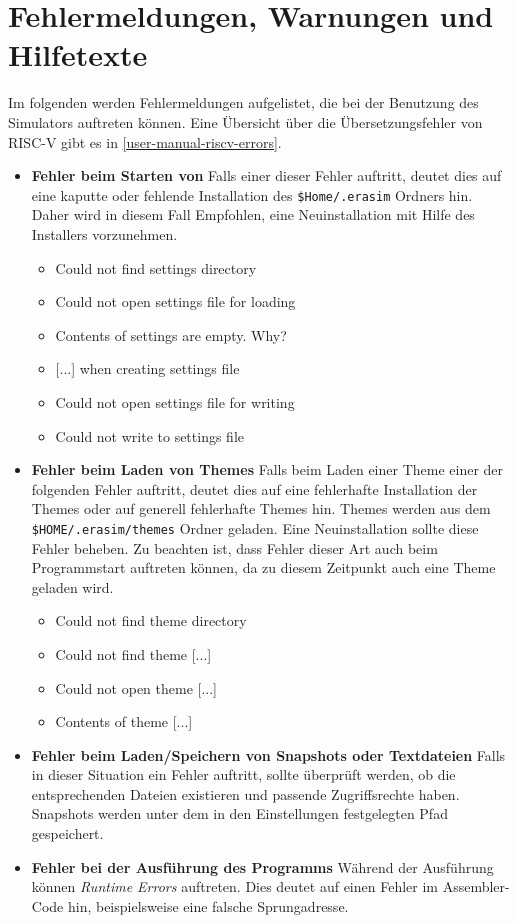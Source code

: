 
\section{Fehlermeldungen, Warnungen und Hilfetexte}

Im folgenden werden Fehlermeldungen aufgelistet, die bei der Benutzung des Simulators auftreten können.
Eine Übersicht über die Übersetzungsfehler von RISC-V gibt es in \autoref{user-manual-riscv-errors}.

\begin{itemize}
    \item \textbf{Fehler beim Starten von \erasim} Falls einer dieser Fehler
    auftritt, deutet dies auf eine kaputte oder fehlende Installation des
    \texttt{\$Home/.erasim} Ordners hin. Daher wird in diesem Fall Empfohlen,
    eine Neuinstallation mit Hilfe des Installers vorzunehmen.
        \begin{itemize}
            \item Could not find settings directory
            \item Could not open settings file for loading
            \item Contents of settings are empty. Why?
            \item {[...]} when creating settings file
            \item Could not open settings file for writing
            \item Could not write to settings file
        \end{itemize}
    \item \textbf{Fehler beim Laden von Themes} Falls beim Laden einer Theme
    einer der folgenden Fehler auftritt, deutet dies auf eine fehlerhafte
    Installation der Themes oder auf generell fehlerhafte Themes hin. Themes
    werden aus dem \texttt{\$HOME/.erasim/themes} Ordner geladen. Eine
    Neuinstallation sollte diese Fehler beheben. Zu beachten ist, dass Fehler
    dieser Art auch beim Programmstart auftreten können, da zu diesem Zeitpunkt
    auch eine Theme geladen wird.
        \begin{itemize}
            \item Could not find theme directory
            \item Could not find theme {[...]}
            \item Could not open theme {[...]}
            \item Contents of theme {[...]}
        \end{itemize}
    \item \textbf{Fehler beim Laden/Speichern von Snapshots oder Textdateien}
    Falls in dieser Situation ein Fehler auftritt, sollte überprüft werden, ob
    die entsprechenden Dateien existieren und passende Zugriffsrechte haben.
    Snapshots werden unter dem in den Einstellungen festgelegten Pfad
    gespeichert.
    \item \textbf{Fehler bei der Ausführung des Programms} Während der
    Ausführung können \textit{Runtime Errors} auftreten. Dies deutet auf einen
    Fehler im Assembler-Code hin, beispielsweise eine falsche Sprungadresse.
\end{itemize}

